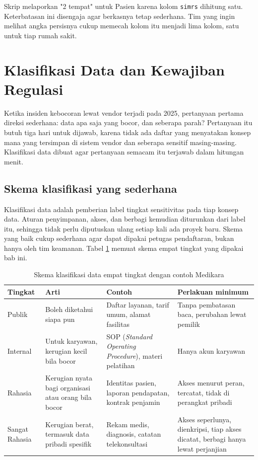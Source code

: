 \begin{pendalaman}
  Skrip melaporkan "2 tempat" untuk Pasien karena kolom \texttt{simrs} dihitung
  satu. Keterbatasan ini disengaja agar berkasnya tetap sederhana. Tim yang
  ingin melihat angka persisnya cukup memecah kolom itu menjadi lima kolom,
  satu untuk tiap rumah sakit.
\end{pendalaman}

\section{Klasifikasi Data dan Kewajiban Regulasi}

Ketika insiden kebocoran lewat vendor terjadi pada 2025, pertanyaan pertama
direksi sederhana: data apa saja yang bocor, dan seberapa parah? Pertanyaan itu
butuh tiga hari untuk dijawab, karena tidak ada daftar yang menyatakan konsep
mana yang tersimpan di sistem vendor dan seberapa sensitif masing-masing.
Klasifikasi data dibuat agar pertanyaan semacam itu terjawab dalam hitungan
menit.

\subsection*{Skema klasifikasi yang sederhana}

Klasifikasi data adalah pemberian label tingkat sensitivitas pada tiap konsep
data. Aturan penyimpanan, akses, dan berbagi kemudian diturunkan dari label
itu, sehingga tidak perlu diputuskan ulang setiap kali ada proyek baru. Skema
yang baik cukup sederhana agar dapat dipakai petugas pendaftaran, bukan hanya
oleh tim keamanan. Tabel \ref{tab:ch06-klasifikasi} memuat skema empat tingkat
yang dipakai bab ini.

\begin{table}[!htb]
  \centering
  \caption{Skema klasifikasi data empat tingkat dengan contoh Medikara}
  \label{tab:ch06-klasifikasi}
  \begin{tabularx}{\textwidth}{lXXX}
    \hline
    \textbf{Tingkat} & \textbf{Arti} & \textbf{Contoh} & \textbf{Perlakuan
      minimum} \\
    \hline
    Publik & Boleh diketahui siapa pun & Daftar layanan, tarif umum, alamat
      fasilitas & Tanpa pembatasan baca, perubahan lewat pemilik \\
    \hline
    Internal & Untuk karyawan, kerugian kecil bila bocor & SOP (\textit{Standard
      Operating Procedure}), materi pelatihan & Hanya akun karyawan \\
    \hline
    Rahasia & Kerugian nyata bagi organisasi atau orang bila bocor & Identitas
      pasien, laporan pendapatan, kontrak penjamin & Akses menurut peran,
      tercatat, tidak di perangkat pribadi \\
    \hline
    Sangat Rahasia & Kerugian berat, termasuk data pribadi spesifik & Rekam
      medis, diagnosis, catatan telekonsultasi & Akses seperlunya, dienkripsi,
      tiap akses dicatat, berbagi hanya lewat perjanjian \\
    \hline
  \end{tabularx}
\end{table}

